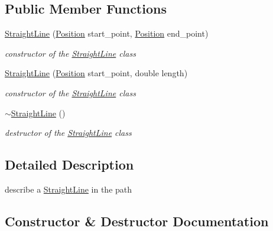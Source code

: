 \subsection*{Public Member Functions}
\begin{DoxyCompactItemize}
\item 
\mbox{\hyperlink{class_path2_d_1_1_element_1_1_straight_line_a831171d36fe596a4b891d9db7c513af6}{Straight\+Line}} (\mbox{\hyperlink{class_path2_d_1_1_element_1_1_position}{Position}} start\+\_\+point, \mbox{\hyperlink{class_path2_d_1_1_element_1_1_position}{Position}} end\+\_\+point)
\begin{DoxyCompactList}\small\item\em constructor of the \mbox{\hyperlink{class_path2_d_1_1_element_1_1_straight_line}{Straight\+Line}} class \end{DoxyCompactList}\item 
\mbox{\hyperlink{class_path2_d_1_1_element_1_1_straight_line_a618128b2e4005f9671d55165ddc114de}{Straight\+Line}} (\mbox{\hyperlink{class_path2_d_1_1_element_1_1_position}{Position}} start\+\_\+point, double length)
\begin{DoxyCompactList}\small\item\em constructor of the \mbox{\hyperlink{class_path2_d_1_1_element_1_1_straight_line}{Straight\+Line}} class \end{DoxyCompactList}\item 
\mbox{\label{class_path2_d_1_1_element_1_1_straight_line_a5b61a97e2f0b06ecf09b534fcfc645f3}} 
\mbox{\hyperlink{class_path2_d_1_1_element_1_1_straight_line_a5b61a97e2f0b06ecf09b534fcfc645f3}{$\sim$\+Straight\+Line}} ()
\begin{DoxyCompactList}\small\item\em destructor of the \mbox{\hyperlink{class_path2_d_1_1_element_1_1_straight_line}{Straight\+Line}} class \end{DoxyCompactList}\end{DoxyCompactItemize}


\subsection{Detailed Description}
describe a \mbox{\hyperlink{class_path2_d_1_1_element_1_1_straight_line}{Straight\+Line}} in the path 

\subsection{Constructor \& Destructor Documentation}
\mbox{\label{class_path2_d_1_1_element_1_1_straight_line_a831171d36fe596a4b891d9db7c513af6}} 

